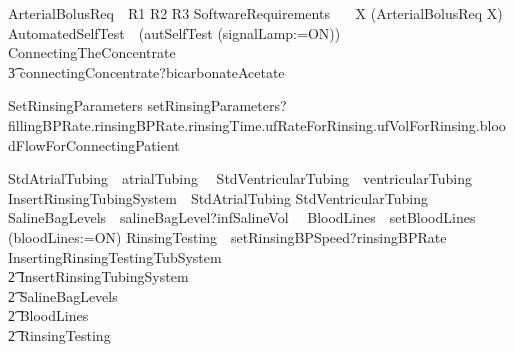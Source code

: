 \begin{circus}
  ArterialBolusReq~\circdef~R1 \interleave R2 \interleave R3
  SoftwareRequirements~\circdef~
      \circmu~X \circspot
      (ArterialBolusReq
                \circseq X)\\

  AutomatedSelfTest~\circdef~(autSelfTest \then (signalLamp:=ON))
  ConnectingTheConcentrate~\circdef~
  \\\t3 connectingConcentrate?bicarbonateAcetate \then \Skip

  SetRinsingParameters \circdef
    setRinsingParameters?fillingBPRate.rinsingBPRate.rinsingTime.ufRateForRinsing.ufVolForRinsing.bloodFlowForConnectingPatient \then \Skip

  StdAtrialTubing~\circdef~atrialTubing~\then~\Skip
  StdVentricularTubing~\circdef~ventricularTubing~\then~\Skip
  InsertRinsingTubingSystem~\circdef~StdAtrialTubing \interleave StdVentricularTubing
  SalineBagLevels~\circdef~salineBagLevel?infSalineVol~\then~\Skip
  BloodLines~\circdef~setBloodLines \then (bloodLines:=ON)
  RinsingTesting~\circdef~setRinsingBPSpeed?rinsingBPRate~\then~\Skip
  InsertingRinsingTestingTubSystem~\circdef~
    \\\t2 InsertRinsingTubingSystem\circseq
    \\\t2 SalineBagLevels\circseq
    \\\t2 BloodLines\circseq
    \\\t2 RinsingTesting


\end{circus}
